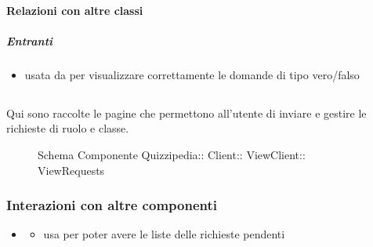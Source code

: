 \paragraph{Relazioni con altre classi}
\subparagraph{Entranti}
\begin{itemize}
\item usata da  per visualizzare correttamente le domande di tipo vero/falso
\end{itemize}
\subsection{}
Qui sono raccolte le pagine che permettono all'utente di inviare e gestire le richieste di ruolo e classe.
\begin{figure}[H]
\centering
\noindent{}
\caption[Schema Componente ViewRequests]{Schema Componente Quizzipedia:: Client:: ViewClient:: ViewRequests}
\end{figure}
\subsubsection{Interazioni con altre componenti}
\begin{itemize}
\item {}
\begin{itemize}
\item usa  per poter avere le liste delle richieste pendenti
\end{itemize}
\end{itemize}
